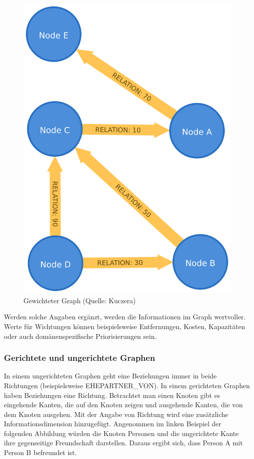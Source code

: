\begin{figure}
\centering
\includegraphics{Bilder/weightedGraph.png}
\caption{Gewichteter Graph (Quelle: Kuczera)}
\end{figure}

Werden solche Angaben ergänzt, werden die Informationen im Graph
wertvoller. Werte für Wichtungen können beispielsweise Entfernungen,
Kosten, Kapazitäten oder auch domänenspezifische Priorisierungen sein.

\hypertarget{gerichtete-und-ungerichtete-graphen}{%
\subsubsection{Gerichtete und ungerichtete
Graphen}\label{gerichtete-und-ungerichtete-graphen}}

In einem ungerichteten Graphen geht eine Beziehungen immer in beide
Richtungen (beispielsweise EHEPARTNER\_VON). In einem gerichteten
Graphen haben Beziehungen eine Richtung. Betrachtet man einen Knoten
gibt es eingehende Kanten, die auf den Knoten zeigen und ausgehende
Kanten, die von dem Knoten ausgehen. Mit der Angabe von Richtung wird
eine zusätzliche Informationsdimension hinzugefügt. Angenommen im linken
Beispiel der folgenden Abbildung würden die Knoten Personen und die
ungerichtete Kante ihre gegenseitige Freundschaft darstellen. Daraus
ergibt sich, dass Person A mit Person B befreundet ist.

